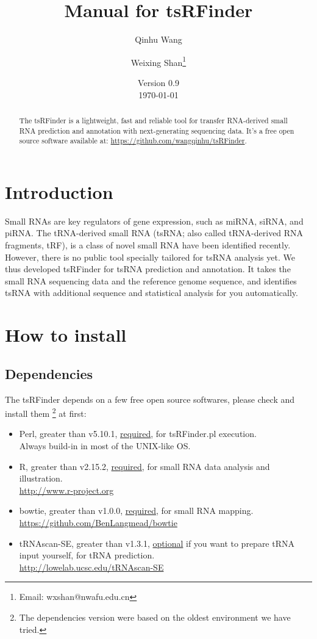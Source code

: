 \documentclass[11pt, a4paper]{article}
\title{Manual for tsRFinder}
\author{Qinhu Wang}
\author{Weixing Shan\thanks{Email: wxshan@nwafu.edu.cn}}
\affil{Northwest A\&F University}
\date{Version 0.9\\[3pt] \today}
\begin{document}
\maketitle

\begin{abstract}
The tsRFinder is a lightweight, fast and reliable tool for transfer RNA-derived small RNA prediction and annotation with next-generating sequencing data. It's a free open source software available at: \url{https://github.com/wangqinhu/tsRFinder}.
\end{abstract}

\clearpage

\tableofcontents

\clearpage

\section{Introduction}

Small RNAs are key regulators of gene expression, such as miRNA, siRNA, and piRNA. The tRNA-derived small RNA (tsRNA; also called tRNA-derived RNA fragments, tRF), is a class of novel small RNA have been identified recently. However, there is no public tool specially tailored for tsRNA analysis yet. We thus developed tsRFinder for tsRNA prediction and annotation. It takes the small RNA sequencing data and the reference genome sequence, and identifies tsRNA with additional sequence and statistical analysis for you automatically.

\section{How to install}

\subsection{Dependencies}

The tsRFinder depends on a few free open source softwares, please check and install them \footnote{The dependencies version were based on the oldest environment we have tried.} at first:

\begin{itemize}

\item Perl, greater than v5.10.1, \underline{required}, for tsRFinder.pl execution.\\ Always build-in in most of the UNIX-like OS.
\item R, greater than v2.15.2, \underline{required}, for small RNA data analysis and illustration. \\\url{http://www.r-project.org}
\item bowtie, greater than v1.0.0, \underline{required}, for small RNA mapping. \\\url{https://github.com/BenLangmead/bowtie}
\item tRNAscan-SE, greater than v1.3.1, \underline{optional} if you want to prepare tRNA input yourself, for tRNA prediction. \\\url{http://lowelab.ucsc.edu/tRNAscan-SE}

\end{itemize}
\end{document}
